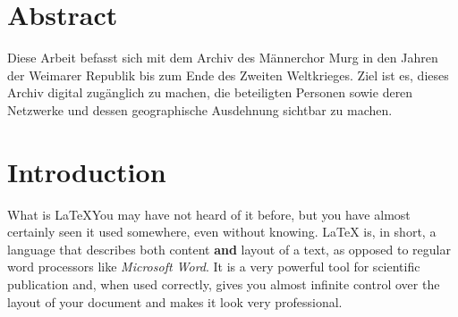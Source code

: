 \documentclass[12pt, a4paper, ngerman, bidi=default]{article}
\renewcommand*\contentsname{Inhaltsverzeichnis}
\newcommand\contentsname{Inhaltsverzeichnis}
\begin{document}
\pagecolor{white}  
\color{black}  %
\section*{Abstract}

Diese Arbeit befasst sich mit dem Archiv des Männerchor Murg in den Jahren der Weimarer Republik bis zum Ende des Zweiten Weltkrieges. Ziel ist es, dieses Archiv digital zugänglich zu machen, die beteiligten Personen sowie deren Netzwerke und dessen geographische Ausdehnung sichtbar zu machen.








\renewcommand*\contentsname{Table of Contents} %
{
\hypersetup{linkcolor=}
\setcounter{tocdepth}{5} %
\tableofcontents
}
\newpage
{} %



\section{Introduction}

What is LaTeX\@ You may have not heard of it before, but you have almost certainly seen it used somewhere, even without knowing. LaTeX is, in short, a language that describes both content \textbf{and} layout of a text, as opposed to regular word processors like \emph{Microsoft Word}. It is a very powerful tool for scientific publication and, when used correctly, gives you almost infinite control over the layout of your document and makes it look very professional.
\end{document}
